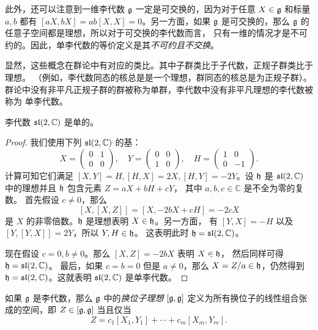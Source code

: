 此外，还可以注意到一维李代数 $\mathfrak{g}$ 一定是可交换的，因为对于任意
$X\in\mathfrak{g}$ 和标量 $a,b$ 都有 $[aX,bX]=ab[X,X]=0$。另一方面，如果 $\mathfrak{g}$
是可交换的，那么 $\mathfrak{g}$ 的任意子空间都是理想，所以对于可交换的李代数而言，
只有一维的情况才是不可约的。因此，单李代数的等价定义是其\emph{不可约且不交换}。

显然，这些概念在群论中有对应的类比。其中子群类比于子代数，正规子群类比于理想。
（例如，李代数同态的核总是是一个理想，群同态的核总是为正规子群）。
群论中没有非平凡正规子群的群被称为单群，李代数中没有非平凡理想的李代数被称为
单李代数。

\begin{proposition}
  李代数 $\mathfrak{sl}(2,\mathbb{C})$ 是单的。
\end{proposition}
\begin{proof}
  我们使用下列 $\mathfrak{sl}(2,\mathbb{C})$ 的基：
  \[
    X=\begin{pmatrix}
      0 & 1 \\ 0 & 0
    \end{pmatrix},\quad
    Y=\begin{pmatrix}
      0 & 0 \\ 1 & 0
    \end{pmatrix},\quad
    H=\begin{pmatrix}
      1 & 0 \\ 0 & -1
    \end{pmatrix}.
  \]
  计算可知它们满足 $[X,Y]=H,[H,X]=2X,[H,Y]=-2Y$。设 $\mathfrak{h}$
  是 $\mathfrak{sl}(2,\mathbb{C})$ 中的理想并且 $\mathfrak{h}$ 包含元素 $Z=aX+bH+cY$，
  其中 $a,b,c\in \mathbb{C}$ 是不全为零的复数。
  首先假设 $c\neq 0$，那么
  \[
    [X,[X,Z]]=[X,-2bX+cH]=-2cX
  \]
  是 $X$ 的非零倍数。$\mathfrak{h}$ 是理想表明 $X\in\mathfrak{h}$。另一方面，
  有 $[Y,X]=-H$ 以及 $[Y,[Y,X]]=2Y$，所以 $Y,H\in \mathfrak{h}$。
  这表明此时 $\mathfrak{h}=\mathfrak{sl}(2,\mathbb{C})$。

  现在假设 $c=0,b\neq 0$。那么 $[X,Z]=-2bX$ 表明 $X\in\mathfrak{h}$，
  然后同样可得 $\mathfrak{h}=\mathfrak{sl}(2,\mathbb{C})$。
  最后，如果 $c=b=0$ 但是 $a\neq 0$，那么 $X=Z/a\in\mathfrak{h}$，仍然得到 
  $\mathfrak{h}=\mathfrak{sl}(2,\mathbb{C})$。这就表明 $\mathfrak{sl}(2,\mathbb{C})$
  是单李代数。
\end{proof}

\begin{definition}
  如果 $\mathfrak{g}$ 是李代数，那么 $\mathfrak{g}$ 中的\emph{换位子理想} $[\mathfrak{g},\mathfrak{g}]$
  定义为所有换位子的线性组合张成的空间，即 $Z\in[\mathfrak{g},\mathfrak{g}]$ 当且仅当
  \[
    Z=c_1[X_1,Y_1]+\cdots+c_m[X_m,Y_m].
  \]
\end{definition}

